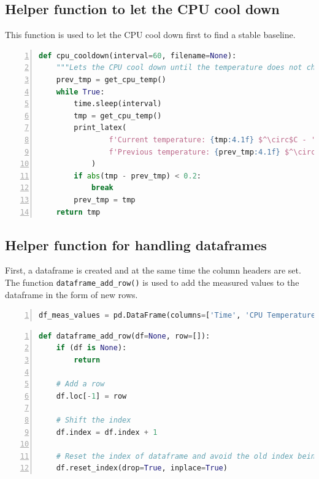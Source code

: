 \documentclass[10pt,parskip=half,
toc=sectionentrywithdots,
bibliography=totocnumbered,
captions=tableheading,numbers=noendperiod]{scrartcl}
\begin{document}
\hypertarget{helper-function-to-let-the-cpu-cool-down}{%
\subsection{Helper function to let the CPU cool
down}\label{helper-function-to-let-the-cpu-cool-down}}

This function is used to let the CPU cool down first to find a stable
baseline.

\begin{codecell}[H]
\caption{Function to let CPU cool down}
\label{code:f_cooldown_cpu}
\begin{lstlisting}[language=Python,numbers=left,xleftmargin=20pt,xrightmargin=5pt,belowskip=5pt,aboveskip=5pt]
def cpu_cooldown(interval=60, filename=None):
    """Lets the CPU cool down until the temperature does not change anymore."""
    prev_tmp = get_cpu_temp()
    while True:
        time.sleep(interval)
        tmp = get_cpu_temp()
        print_latex(
                f'Current temperature: {tmp:4.1f} $^\circ$C - '
                f'Previous temperature: {prev_tmp:4.1f} $^\circ$C'
            )
        if abs(tmp - prev_tmp) < 0.2:
            break
        prev_tmp = tmp
    return tmp
\end{lstlisting}\end{codecell}

\hypertarget{helper-function-for-handling-dataframes}{%
\subsection{Helper function for handling
dataframes}\label{helper-function-for-handling-dataframes}}

First, a dataframe is created and at the same time the column headers
are set. The function \texttt{dataframe\_add\_row()} is used to add the
measured values to the dataframe in the form of new rows.

\begin{codecell}[H]
\caption{Dataframe for the measuring values}
\label{code:df_meas_values}
\begin{lstlisting}[language=Python,numbers=left,xleftmargin=20pt,xrightmargin=5pt,belowskip=5pt,aboveskip=5pt]
df_meas_values = pd.DataFrame(columns=['Time', 'CPU Temperature', 'CPU Frequency', 'Ambient Temperature'])
\end{lstlisting}\end{codecell}

\begin{codecell}[H]
\caption{Function for adding rows to dataframes}
\label{code:f_df_add_rows}
\begin{lstlisting}[language=Python,numbers=left,xleftmargin=20pt,xrightmargin=5pt,belowskip=5pt,aboveskip=5pt]
def dataframe_add_row(df=None, row=[]):
    if (df is None):
        return

    # Add a row
    df.loc[-1] = row

    # Shift the index
    df.index = df.index + 1

    # Reset the index of dataframe and avoid the old index being added as a column
    df.reset_index(drop=True, inplace=True)
\end{lstlisting}\end{codecell}
\end{document}
